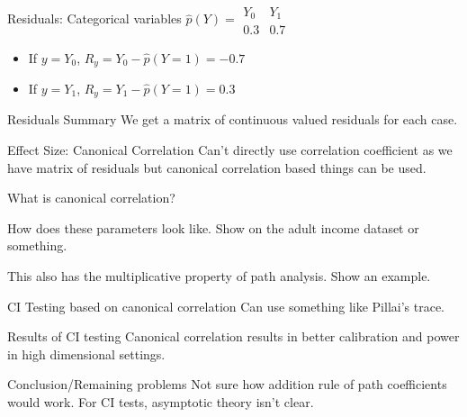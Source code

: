 \documentclass{beamer}
\begin{document}
\begin{frame}{Residuals: Categorical variables}
	$\hat{p}(Y) = \begin{array}{ll} Y_0 & Y_1 \\ 0.3 & 0.7 \end{array} $
	\begin{itemize}	
		\item If $ y = Y_0 $, $ R_{y} = Y_0 - \hat{p}(Y=1) = -0.7 $
		\item If $ y = Y_1 $, $ R_{y} = Y_1 - \hat{p}(Y=1) = 0.3 $
	\end{itemize}
\end{frame}

\begin{frame}{Residuals Summary}
	We get a matrix of continuous valued residuals for each case.
\end{frame}

\begin{frame}{Effect Size: Canonical Correlation}
	Can't directly use correlation coefficient as we have matrix of
	residuals but canonical correlation based things can be used.

	What is canonical correlation?
\end{frame}

\begin{frame}
	How does these parameters look like. Show on the adult income dataset
	or something.

	This also has the multiplicative property of path analysis. Show an
	example.
\end{frame}

\begin{frame}{CI Testing based on canonical correlation}
	Can use something like Pillai's trace.
\end{frame}

\begin{frame}{Results of CI testing}
	Canonical correlation results in better calibration and power in high
	dimensional settings.
\end{frame}

\begin{frame}{Conclusion/Remaining problems}
	Not sure how addition rule of path coefficients would work.
	For CI tests, asymptotic theory isn't clear.
\end{frame}
\end{document}
